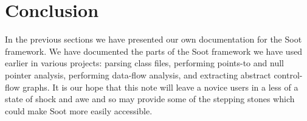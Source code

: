 \documentclass{article}
\begin{document}
\section{Conclusion}
In the previous sections we have presented our own documentation for
the Soot framework. We have documented the parts of the Soot framework
we have used earlier in various projects: parsing class files,
performing points-to and null pointer analysis, performing data-flow
analysis, and extracting abstract control-flow graphs. It is our hope
that this note will leave a novice users in a less of a state of shock
and awe and so may provide some of the stepping stones which could make
Soot more easily accessible.

\clearpage


\nocite{*}


\end{document}
